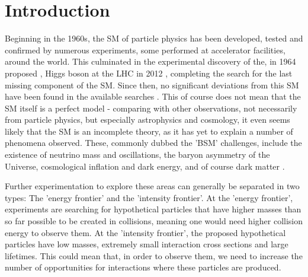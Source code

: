 \chapter{Introduction}




    Beginning in the 1960s, the \ac{SM} of particle physics has been developed, tested and confirmed by numerous experiments, some performed at accelerator facilities, around the world.
	This culminated in the experimental discovery of the, in 1964 proposed \cite{CERN-HIGGS}, Higgs boson at the \ac{LHC} in 2012 \cite{CERN-LHC}, completing the search for the last missing component of the \ac{SM}.
	Since then, no significant deviations from this \ac{SM} have been found in the available searches \cite{CERN-LHC}.
	This of course does not mean that the \ac{SM} itself is a perfect model -
	comparing with other observations, not necessarily from particle physics, but especially astrophysics and cosmology, it even seems likely that the \ac{SM} is an incomplete theory, as it has yet to explain a number of phenomena observed.
	These, commonly dubbed the '\ac{BSM}' challenges, include the existence of neutrino mass and oscillations, the baryon asymmetry of the Universe, cosmological inflation and dark energy, and of course dark matter \cite{PHYSICS-CASE}.
	
	Further experimentation to explore these areas can generally be separated in two types: The
	'energy frontier' and the 'intensity frontier'. At the 'energy frontier', experiments are searching for hypothetical particles that have higher masses than so far possible to be created in collisions, meaning one would need higher collision energy to observe them.
	At the 'intensity frontier', the proposed hypothetical particles have low masses, extremely small interaction cross sections and large lifetimes. This could mean that, in order to observe them, we need to increase the number of opportunities for interactions where these particles are produced.
	
